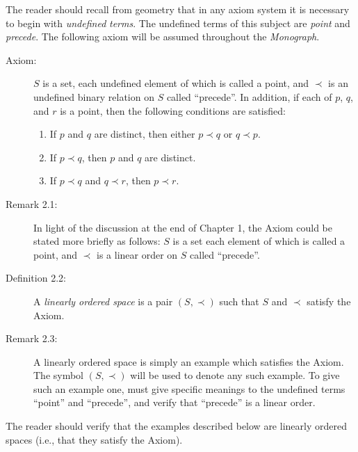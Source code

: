 \documentclass{book}
\begin{document}
The reader should recall from geometry that in any axiom system it is necessary to begin with \emph{undefined} \emph{terms}. The undefined terms of this subject are \emph{point} and \emph{precede}. The following axiom will be assumed throughout the \emph{Monograph}.

\begin{description}

\item[Axiom:] $S$ is a set, each undefined element of which is called a point, and $\prec$ is an undefined binary relation on $S$ called ``precede''. In addition, if each of $p$, $q$, and $r$ is a point, then the following conditions are satisfied:
\begin{enumerate}[\hspace{1cm}(a)]
  \item If $p$ and $q$ are distinct, then either $p \prec q$ or $q \prec p$.
  \item If $p \prec q$, then $p$ and $q$ are distinct.
  \item If $p \prec q$ and $q \prec r$, then $p \prec r$.
\end{enumerate}

\item[Remark 2.1:] In light of the discussion at the end of Chapter 1, the Axiom could be stated more briefly as follows: $S$ is a set each element of which is called a point, and $\prec$ is a linear order on $S$ called ``precede''.

\item[Definition 2.2:] A \emph{linearly ordered space} is a pair $(S, \prec)$ such that $S$ and $\prec$ satisfy the Axiom.

\item[Remark 2.3:] A linearly ordered space is simply an example which satisfies the Axiom. The symbol $(S, \prec)$ will be used to denote any such example. To give such an example one, must give specific meanings to the undefined terms ``point'' and ``precede'', and verify that ``precede'' is a linear order.

\end{description}

The reader should verify that the examples described below are linearly ordered spaces (i.e., that they satisfy the Axiom).
\end{document}
